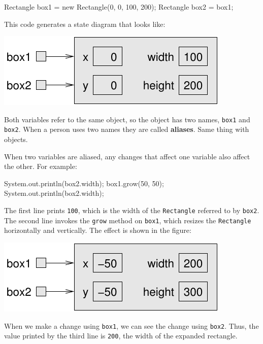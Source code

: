 \documentclass[12pt]{book}
\theoremstyle{exercise}
\newcommand{\java}[1]{\verb"#1"}
\newcommand{\java}[1]{\lstinline{#1}} %
\begin{document}
\begin{code}
    Rectangle box1 = new Rectangle(0, 0, 100, 200);
    Rectangle box2 = box1;
\end{code}

This code generates a state diagram that looks like:

\begin{center}
\includegraphics{figs/aliasing.pdf}
\end{center}


Both variables refer to the same object, so the object has two names, \java{box1} and \java{box2}.
When a person uses two names they are called {\bf aliases}.
Same thing with objects.

When two variables are aliased, any changes that affect one variable also affect the other.
For example:

\begin{code}
    System.out.println(box2.width);
    box1.grow(50, 50);
    System.out.println(box2.width);
\end{code}

The first line prints {\tt 100}, which is the width of the \java{Rectangle} referred to by \java{box2}.
The second line invokes the \java{grow} method on \java{box1}, which resizes the \java{Rectangle} horizontally and vertically.
The effect is shown in the figure:

\begin{center}
\includegraphics{figs/aliasing2.pdf}
\end{center}

When we make a change using \java{box1}, we can see the change using \java{box2}.
Thus, the value printed by the third line is {\tt 200}, the width of the expanded rectangle.
\end{document}
